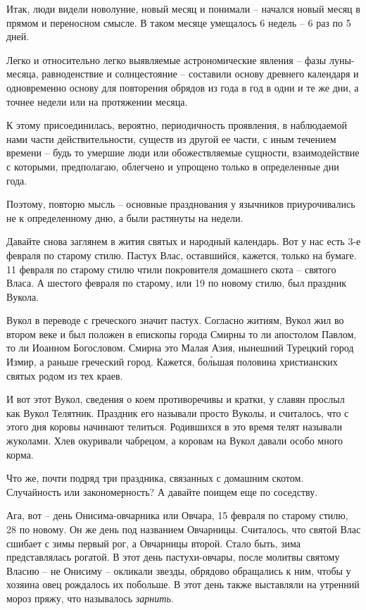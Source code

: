 \documentclass[a5paper,11pt,openany]{article}
\begin{document}
   Итак, люди видели новолуние, новый месяц и понимали – начался новый месяц в прямом и переносном смысле. В таком месяце умещалось 6 недель – 6 раз по 5 дней.

   Легко и относительно легко выявляемые астрономические явления – фазы луны-месяца, равноденствие и солнцестояние –  составили основу древнего календаря и одновременно основу для повторения обрядов из года в год в одни и те же дни, а точнее недели или на протяжении месяца.

   К этому присоединилась, вероятно, периодичность проявления, в наблюдаемой нами части действительности, существ из другой ее части, с иным течением времени – будь то умершие люди или обожествляемые сущности, взаимодействие с которыми, предполагаю, облегчено и упрощено только в определенные дни года.

  Поэтому, повторю мысль – основные празднования у язычников приурочивались не к определенному дню, а были растянуты на недели.

   Давайте снова заглянем в жития святых и народный календарь. Вот у нас есть 3-е февраля по старому стилю. Пастух Влас, оставшийся, кажется, только на бумаге. 11 февраля по старому стилю чтили покровителя домашнего скота – святого Власа. А шестого февраля по старому, или 19 по новому стилю, был праздник Вукола.

   Вукол в переводе с греческого значит пастух. Согласно житиям, Вукол жил во втором веке и был положен в епископы города Смирны то ли апостолом Павлом, то ли Иоанном Богословом. Смирна это Малая Азия, нынешний Турецкий город Измир, а раньше греческий город. Кажется, бо\'льшая половина христианских святых родом из тех краев.

   И вот этот Вукол, сведения о коем противоречивы и кратки, у славян прослыл как Вукол Телятник. Праздник его называли просто Вуколы, и считалось, что с этого дня коровы начинают телиться. Родившихся в это время телят называли жуколами. Хлев окуривали чабрецом, а коровам на Вукол давали особо много корма.

  Что же, почти подряд три праздника, связанных с домашним скотом. Случайность или закономерность? А давайте поищем еще по соседству.

  Ага, вот – день Онисима-овчарника или Овчара, 15 февраля по старому стилю, 28 по новому. Он же день под названием Овчарницы. Считалось, что святой Влас сшибает с зимы первый рог, а Овчарницы второй. Стало быть, зима представлялась рогатой. В этот день пастухи-овчары, после молитвы святому Власию – не Онисиму – окликали звезды, обрядово обращались к ним, чтобы у хозяина овец рождалось их побольше. В этот день также выставляли на утренний мороз пряжу, что называлось \textit{ зарнить}.
\end{document}

